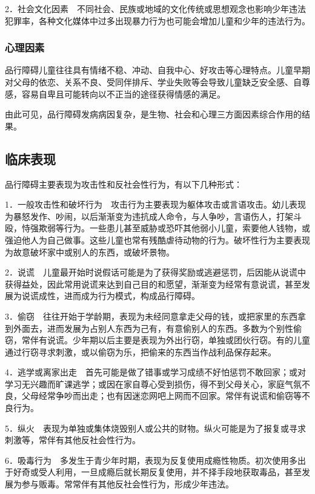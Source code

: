 2．社会文化因素　不同社会、民族或地域的文化传统或思想观念也影响少年违法犯罪率，各种文化媒体中过多出现暴力行为也可能会增加儿童和少年的违法行为。

\subsubsection{心理因素}

品行障碍儿童往往具有情绪不稳、冲动、自我中心、好攻击等心理特点。儿童早期对父母的依恋、关系不良、受同伴排斥、学业失败等会导致儿童缺乏安全感、自尊感，容易自卑且可能转向以不正当的途径获得情感的满足。

由此可见，品行障碍发病病因复杂，是生物、社会和心理三方面因素综合作用的结果。

\subsection{临床表现}

品行障碍主要表现为攻击性和反社会性行为，有以下几种形式：

1．一般攻击性和破坏行为　攻击行为主要表现为躯体攻击或言语攻击。幼儿表现为暴怒发作、吵闹，以后渐渐变为违抗成人命令，与人争吵，言语伤人，打架斗殴，恃强欺弱等行为。一些患儿甚至威胁或恐吓其他弱小儿童，索要他人钱物，或强迫他人为自己做事。这些儿童也常有残酷虐待动物的行为。破坏性行为主要表现为故意破坏家中或别人的东西，或破坏景物。

2．说谎　儿童最开始时说假话可能是为了获得奖励或逃避惩罚，后因能从说谎中获得益处，因此常用说谎来达到自己目的和愿望，渐渐变为经常有意说谎，甚至发展为说谎成性，进而成为行为模式，构成品行障碍。

3．偷窃　往往开始于学龄期，表现为未经同意拿走父母的钱，或把家里的东西拿到外面去，进而发展为占别人东西为己有，有意偷别人的东西。多数为个别性偷窃，常伴有说谎。少年期以后主要是表现为外出行窃，单独或团伙行窃。有的儿童通过行窃寻求刺激，或以偷窃为乐，把偷来的东西当作战利品保存起来。

4．逃学或离家出走　首先可能是做了错事或学习成绩不好怕惩罚不敢回家；或对学习无兴趣而旷课逃学；或因在家自尊心受到损伤，得不到父母关心，家庭气氛不良，父母经常争吵而出走；也有因迷恋网吧上网而不回家。常伴有说谎和偷窃等不良行为。

5．纵火　表现为单独或集体烧毁别人或公共的财物。纵火可能是为了报复或寻求刺激等，常伴有其他反社会性行为。

6．吸毒行为　多发生于青少年时期，表现为反复使用成瘾性物质。初次使用多出于好奇或受人利用，一旦成瘾后就长期反复使用，并不择手段地获取毒品，甚至发展为参与贩毒。常常伴有其他反社会性行为，形成少年违法。

